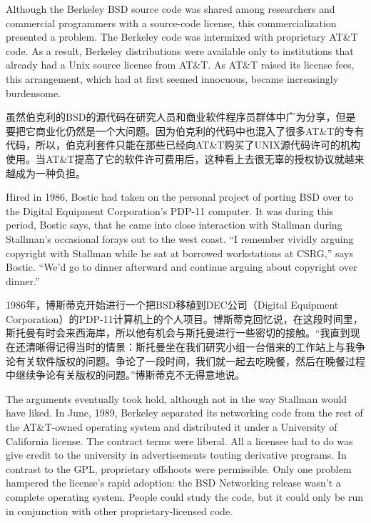 \ifdefined\eng
Although the Berkeley BSD source code was shared among researchers and commercial programmers with a source-code license, this commercialization presented a problem. The Berkeley code was intermixed with proprietary AT\&T code. As a result, Berkeley distributions were available only to institutions that already had a Unix source license from AT\&T. As AT\&T raised its license fees, this arrangement, which had at first seemed innocuous, became increasingly burdensome.
\fi

\ifdefined\chs
虽然伯克利的BSD的源代码在研究人员和商业软件程序员群体中广为分享，但是要把它商业化仍然是一个大问题。因为伯克利的代码中也混入了很多AT\&T的专有代码，所以，伯克利套件只能在那些已经向AT\&T购买了UNIX源代码许可的机构使用。当AT\&T提高了它的软件许可费用后，这种看上去很无辜的授权协议就越来越成为一种负担。
\fi

\ifdefined\eng
Hired in 1986, Bostic had taken on the personal project of porting BSD over to the Digital Equipment Corporation's PDP-11 computer. It was during this period, Bostic says, that he came into close interaction with Stallman during Stallman's occasional forays out to the west coast. ``I remember vividly arguing copyright with Stallman while he sat at borrowed workstations at CSRG,'' says Bostic. ``We'd go to dinner afterward and continue arguing about copyright over dinner.''
\fi

\ifdefined\chs
1986年，博斯蒂克开始进行一个把BSD移植到DEC公司（Digital Equipment Corporation）的PDP-11计算机上的个人项目。博斯蒂克回忆说，在这段时间里，斯托曼有时会来西海岸，所以他有机会与斯托曼进行一些密切的接触。``我直到现在还清晰得记得当时的情景：斯托曼坐在我们研究小组一台借来的工作站上与我争论有关软件版权的问题。争论了一段时间，我们就一起去吃晚餐，然后在晚餐过程中继续争论有关版权的问题。''博斯蒂克不无得意地说。
\fi

\ifdefined\eng
The arguments eventually took hold, although not in the way Stallman would have liked. In June, 1989, Berkeley separated its networking code from the rest of the AT\&T-owned operating system and distributed it under a University of California license. The contract terms were liberal. All a licensee had to do was give credit to the university in advertisements touting derivative programs. In contrast to the GPL, proprietary offshoots were permissible. Only one problem hampered the license's rapid adoption: the BSD Networking release wasn't a complete operating system. People could study the code, but it could only be run in conjunction with other proprietary-licensed code.
\fi

